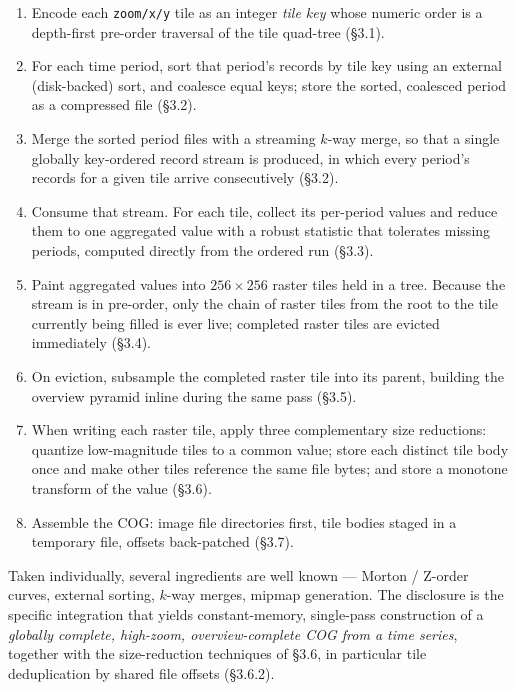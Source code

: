 \documentclass[10pt,twocolumn]{article}
\newcommand{\code}[1]{\texttt{#1}}
\begin{document}
\begin{enumerate}
\item Encode each \code{zoom/x/y} tile as an integer \emph{tile key} whose
  numeric order is a depth-first pre-order traversal of the tile quad-tree
  (\S3.1).
\item For each time period, sort that period's records by tile key using an
  external (disk-backed) sort, and coalesce equal keys; store the sorted,
  coalesced period as a compressed file (\S3.2).
\item Merge the sorted period files with a streaming $k$-way merge, so that a
  single globally key-ordered record stream is produced, in which every
  period's records for a given tile arrive consecutively (\S3.2).
\item Consume that stream. For each tile, collect its per-period values and
  reduce them to one aggregated value with a robust statistic that tolerates
  missing periods, computed directly from the ordered run (\S3.3).
\item Paint aggregated values into $256 \times 256$ raster tiles held in a
  tree. Because the stream is in pre-order, only the chain of raster tiles from
  the root to the tile currently being filled is ever live; completed raster
  tiles are evicted immediately (\S3.4).
\item On eviction, subsample the completed raster tile into its parent,
  building the overview pyramid inline during the same pass (\S3.5).
\item When writing each raster tile, apply three complementary size reductions:
  quantize low-magnitude tiles to a common value; store each distinct tile body
  once and make other tiles reference the same file bytes; and store a monotone
  transform of the value (\S3.6).
\item Assemble the COG: image file directories first, tile bodies staged in a
  temporary file, offsets back-patched (\S3.7).
\end{enumerate}

Taken individually, several ingredients are well known --- Morton / Z-order
curves, external sorting, $k$-way merges, mipmap generation. The disclosure is
the specific integration that yields constant-memory, single-pass construction
of a \emph{globally complete, high-zoom, overview-complete COG from a time
series}, together with the size-reduction techniques of \S3.6, in particular
tile deduplication by shared file offsets (\S3.6.2).

\end{document}

